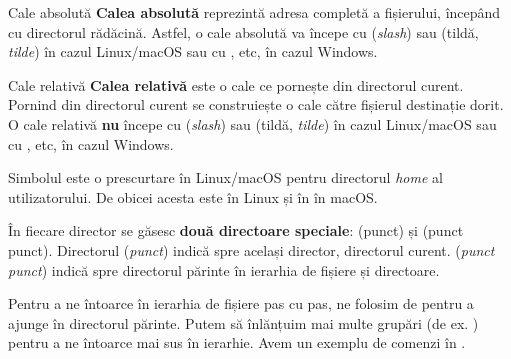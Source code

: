 \begin{definition}{Cale absolută}
\textbf{Calea absolută} reprezintă adresa completă a fișierului, începând cu directorul rădăcină.
Astfel, o cale absolută va începe cu \file{/} (\textit{slash}) sau \file{\textasciitilde{}} (tildă, \textit{tilde}) în cazul Linux/macOS sau cu ,  etc, în cazul Windows.
\end{definition}

\begin{definition}{Cale relativă}
\textbf{Calea relativă} este o cale ce pornește din directorul curent.
Pornind din directorul curent se construiește o cale către fișierul destinație dorit.
O cale relativă \textbf{nu} începe cu \file{/} (\textit{slash}) sau \file{\textasciitilde{}} (tildă, \textit{tilde}) în cazul Linux/macOS sau cu ,  etc, în cazul Windows.
\end{definition}

\begin{note}
Simbolul \file{\textasciitilde{}} este o prescurtare în Linux/macOS pentru directorul \textit{home} al utilizatorului.
De obicei acesta este  în Linux și în  în macOS.
\end{note}

În fiecare director se găsesc \textbf{două directoare speciale}:  (punct) și  (punct punct).
Directorul  (\textit{punct}) indică spre același director, directorul curent.
 (\textit{punct punct}) indică spre directorul părinte în ierarhia de fișiere și directoare.

Pentru a ne întoarce în ierarhia de fișiere pas cu pas, ne folosim de  pentru a ajunge în directorul părinte.
Putem să înlănțuim mai multe grupări  (de ex. ) pentru a ne întoarce mai sus în ierarhie.
Avem un exemplu de comenzi în .


